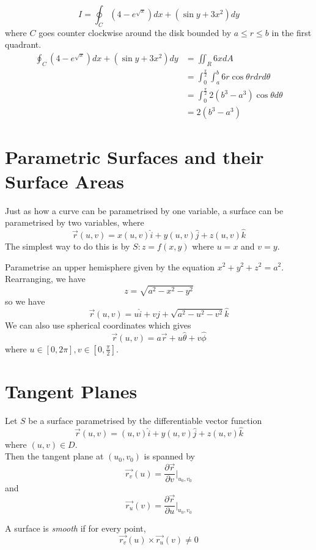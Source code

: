 \documentclass[12pt]{article}
\begin{document}
\begin{ex}
	$$I = \oint_C \left(4-e^{\sqrt{x}}\right)dx + \left(\sin y + 3x^2\right)dy$$
	where $C$ goes counter clockwise around the disk bounded by $a \leq r \leq b$ in the first quadrant.
	\begin{align*}
		\oint_C \left(4-e^{\sqrt{x}}\right)dx + \left(\sin y + 3x^2\right)dy &= \iint_R 6x dA \\
										     &= \int_0^{\frac{\pi}{2}} \int_a^b 6r\cos \theta rdrd\theta \\
										     &= \int_0^{\frac{\pi}{2}} 2(b^3-a^3) \cos\theta d\theta \\
										     &= 2(b^3-a^3)
	\end{align*}
\end{ex}

\section{Parametric Surfaces and their Surface Areas}

Just as how a curve can be parametrised by one variable, a surface can be parametrised by two variables, where
$$\vec{r}(u,v) = x(u,v)\hat{i} + y(u,v)\hat{j} + z(u,v)\hat{k}$$
The simplest way to do this is by $S: z = f(x,y)$ where $u=x$ and $v=y$.

\begin{ex}
	Parametrise an upper hemisphere given by the equation $x^2 + y^2 + z^2 = a^2$. \\
	Rearranging, we have
	$$z = \sqrt{a^2-x^2-y^2}$$
	so we have
	$$\vec{r}(u,v) = u\hat{i} + v\hat{j} + \sqrt{a^2-u^2-v^2}\hat{k}$$
	We can also use spherical coordinates which gives
	$$\vec{r}(u,v) = a\vec{r} + u\hat{\theta} + v\hat{\phi}$$
	where $u \in [0,2\pi], v \in \left[0,\frac{\pi}{2}\right]$.
\end{ex}

\section{Tangent Planes}

Let $S$ be a surface parametrised by the differentiable vector function
$$\vec{r}(u,v) = (u,v)\hat{i} + y(u,v)\hat{j} + z(u,v)\hat{k}$$
where $(u,v) \in D$. \\
Then the tangent plane at $(u_0,v_0)$ is spanned by
$$\vec{r_v}(u) = \frac{\partial \vec{r}}{\partial v} \Big |_{u_0,v_0}$$
and
$$\vec{r_u}(v) = \frac{\partial \vec{r}}{\partial u} \Big |_{u_0,v_0}$$

\begin{defn}
	A surface is \emph{smooth} if for every point,
	$$\vec{r_v}(u) \times \vec{r_u}(v) \neq 0$$
\end{defn}
\end{document}
